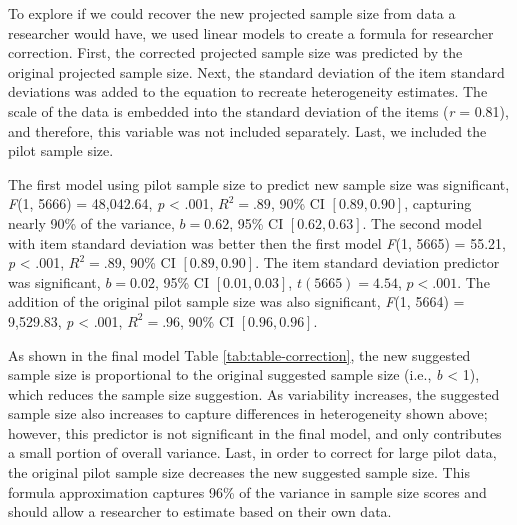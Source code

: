\documentclass[
  man]{apa6}
\begin{document}
To explore if we could recover the new projected sample size from data a researcher would have, we used linear models to create a formula for researcher correction. First, the corrected projected sample size was predicted by the original projected sample size. Next, the standard deviation of the item standard deviations was added to the equation to recreate heterogeneity estimates. The scale of the data is embedded into the standard deviation of the items (\emph{r} = 0.81), and therefore, this variable was not included separately. Last, we included the pilot sample size.

The first model using pilot sample size to predict new sample size was significant, \emph{F}(1, 5666) = 48,042.64, \emph{p} \textless{} .001, \(R^2 = .89\), 90\% CI \([0.89, 0.90]\), capturing nearly 90\% of the variance, \(b = 0.62\), 95\% CI \([0.62, 0.63]\). The second model with item standard deviation was better then the first model \emph{F}(1, 5665) = 55.21, \emph{p} \textless{} .001, \(R^2 = .89\), 90\% CI \([0.89, 0.90]\). The item standard deviation predictor was significant, \(b = 0.02\), 95\% CI \([0.01, 0.03]\), \(t(5665) = 4.54\), \(p < .001\). The addition of the original pilot sample size was also significant, \emph{F}(1, 5664) = 9,529.83, \emph{p} \textless{} .001, \(R^2 = .96\), 90\% CI \([0.96, 0.96]\).

As shown in the final model Table \ref{tab:table-correction}, the new suggested sample size is proportional to the original suggested sample size (i.e., \emph{b} \textless{} 1), which reduces the sample size suggestion. As variability increases, the suggested sample size also increases to capture differences in heterogeneity shown above; however, this predictor is not significant in the final model, and only contributes a small portion of overall variance. Last, in order to correct for large pilot data, the original pilot sample size decreases the new suggested sample size. This formula approximation captures 96\% of the variance in sample size scores and should allow a researcher to estimate based on their own data.
\end{document}
